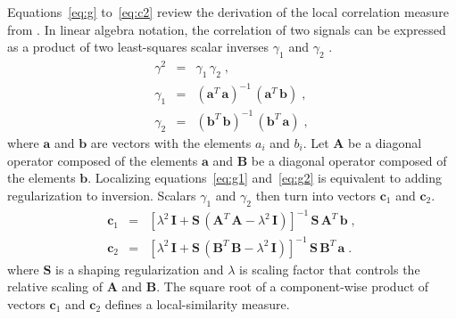 Equations~\ref{eq:g} to~\ref{eq:c2} review the derivation of the local
correlation measure from \cite{Fomel07b}. In linear algebra
notation, the correlation of two signals can be
expressed as a product of two least-squares scalar inverses 
$\gamma_1$ and $\gamma_2$ .
\begin{eqnarray}
  \label{eq:g}
  \gamma^2 & = & \gamma_1\,\gamma_2\;, \\
  \label{eq:g1}
  \gamma_1 & = & \left(\mathbf{a}^T\,\mathbf{a}\right)^{-1}\,\left(\mathbf{a}^T\,\mathbf{b}\right)\;, \\
  \label{eq:g2}
  \gamma_2 & = & \left(\mathbf{b}^T\,\mathbf{b}\right)^{-1}\,\left(\mathbf{b}^T\,\mathbf{a}\right)\;, 
\end{eqnarray}
where $\mathbf{a}$ and $\mathbf{b}$ are vectors with the elements $a_{i}$ and $b_{i}$. 
Let $\mathbf{A}$ be a diagonal operator composed of the elements $\mathbf{a}$ and $\mathbf{B}$
be a diagonal operator composed of the elements $\mathbf{b}$.
Localizing equations~\ref{eq:g1} and~\ref{eq:g2} is equivalent to
adding regularization to inversion. Scalars $\gamma_{1}$ and $\gamma_{2}$ 
then turn into vectors $\mathbf{c}_1$ and $\mathbf{c}_2$.
\begin{eqnarray}
  \label{eq:c1}
  \mathbf{c}_1 & = & 
  \left[\lambda^2\,\mathbf{I} + 
  \mathbf{S}\,\left(\mathbf{A}^T\,\mathbf{A} - \lambda^2\,\mathbf{I}\right)\right]^{-1}\,
  \mathbf{S}\,\mathbf{A}^T\,\mathbf{b}\;, \\
  \label{eq:c2}
  \mathbf{c}_2 & = & 
  \left[\lambda^2\,\mathbf{I} + 
  \mathbf{S}\,\left(\mathbf{B}^T\,\mathbf{B} - \lambda^2\,\mathbf{I}\right)\right]^{-1}\,
  \mathbf{S}\,\mathbf{B}^T\,\mathbf{a}\;.
\end{eqnarray}
where $\mathbf{S}$ is a shaping regularization \cite[]{Fomel07a} and $\lambda$ is
scaling factor that controls the relative scaling of $\mathbf{A}$ and $\mathbf{B}$.
The square root of a component-wise product of vectors $\mathbf{c}_{1}$ and $\mathbf{c}_{2}$ defines a
local-similarity measure.




